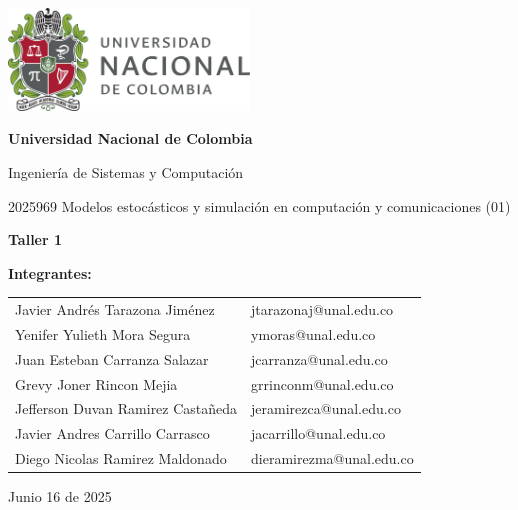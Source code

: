 \documentclass{article}
\begin{document}
\begin{titlepage}
    \centering
    \includegraphics[width=0.48\textwidth]{logo_universidad.png}
    \par\vspace{2cm}

    {\Large \textbf{Universidad Nacional de Colombia} \par}
    \vspace{0.5cm}
    {\large Ingeniería de Sistemas y Computación \par}
    {\large 2025969 Modelos estocásticos y simulación en computación y comunicaciones (01)\par}
    \vspace{3cm}

    {\large \textbf{Taller 1} \par}
    \vspace{3cm}

    {\large \textbf{Integrantes:} \par}
    \vspace{0.5cm}
    \begin{tabular}{ll}
    Javier Andrés Tarazona Jiménez & jtarazonaj@unal.edu.co \\
    Yenifer Yulieth Mora Segura & ymoras@unal.edu.co \\
    Juan Esteban Carranza Salazar & jcarranza@unal.edu.co \\
    Grevy Joner Rincon Mejia & grrinconm@unal.edu.co \\
    Jefferson Duvan Ramirez Castañeda & jeramirezca@unal.edu.co \\
    Javier Andres Carrillo Carrasco & jacarrillo@unal.edu.co \\
    Diego Nicolas Ramirez Maldonado & dieramirezma@unal.edu.co \\
    \end{tabular}
    \par\vspace{3cm}

    {\large Junio 16 de 2025 \par}
\end{titlepage}
\end{document}
